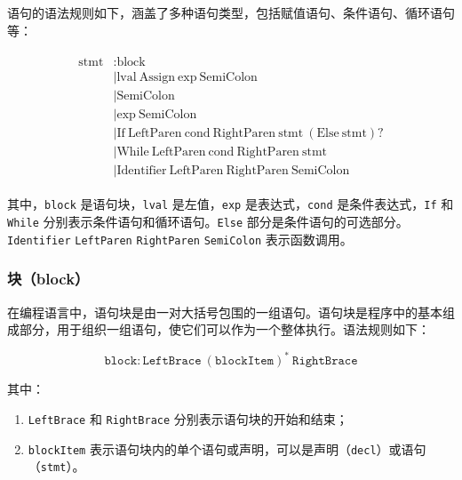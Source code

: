\documentclass[../main.tex]{subfiles}
\begin{document}
语句的语法规则如下，涵盖了多种语句类型，包括赋值语句、条件语句、循环语句等：

\begin{gather*}
	\begin{aligned}
		\text{stmt} & \colon  \text{block}                                                                                             \\
		            & \mid \text{lval} \ \text{Assign} \ \text{exp} \ \text{SemiColon}                                                 \\
		            & \mid \text{SemiColon}                                                                                            \\
		            & \mid \text{exp} \ \text{SemiColon}                                                                               \\
		            & \mid \text{If} \ \text{LeftParen} \ \text{cond} \ \text{RightParen} \ \text{stmt} \ (\text{Else} \ \text{stmt})? \\
		            & \mid \text{While} \ \text{LeftParen} \ \text{cond} \ \text{RightParen} \ \text{stmt}                             \\
		            & \mid \text{Identifier} \ \text{LeftParen} \ \text{RightParen} \ \text{SemiColon}
	\end{aligned}
\end{gather*}

其中，\texttt{block} 是语句块，\texttt{lval} 是左值，\texttt{exp} 是表达式，\texttt{cond} 是条件表达式，\texttt{If} 和 \texttt{While} 分别表示条件语句和循环语句。\texttt{Else} 部分是条件语句的可选部分。\texttt{Identifier} \texttt{LeftParen} \texttt{RightParen} \texttt{SemiColon} 表示函数调用。

\subsubsection{块（block）}

在编程语言中，语句块是由一对大括号包围的一组语句。语句块是程序中的基本组成部分，用于组织一组语句，使它们可以作为一个整体执行。语法规则如下：

\[
	\texttt{block} \colon \texttt{LeftBrace} \ (\texttt{blockItem})^* \ \texttt{RightBrace}
\]

其中：
\begin{enumerate}
	\item \texttt{LeftBrace} 和 \texttt{RightBrace} 分别表示语句块的开始和结束；
	\item \texttt{blockItem} 表示语句块内的单个语句或声明，可以是声明（\texttt{decl}）或语句（\texttt{stmt}）。
\end{enumerate}
\end{document}

